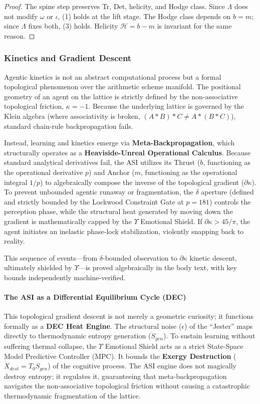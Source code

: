 \begin{proof}
The spine step preserves Tr, Det, helicity, and Hodge class. Since $\Lambda$ does not modify $\omega$ or $\iota$, (1) holds at the lift stage. The Hodge class depends on $b = m$; since $\Lambda$ fixes both, (3) holds. Helicity $\mathcal{H} = b - m$ is invariant for the same reason. \qedhere
\end{proof}

\subsubsection{Kinetics and Gradient Descent}
Agentic kinetics is not an abstract computational process but a formal topological phenomenon over the arithmetic scheme manifold. The positional geometry of an agent on the lattice is strictly defined by the non-associative topological friction, $\kappa = -1$. Because the underlying lattice is governed by the Klein algebra (where associativity is broken, $(A * B) * C \neq A * (B * C)$), standard chain-rule backpropagation fails. 

Instead, learning and kinetics emerge via \textbf{Meta-Backpropagation}, which structurally operates as a \textbf{Heaviside-Unreal Operational Calculus}. Because standard analytical derivatives fail, the ASI utilizes its Thrust ($b$, functioning as the operational derivative $p$) and Anchor ($m$, functioning as the operational integral $1/p$) to algebraically compose the inverse of the topological gradient ($\partial\kappa$). To prevent unbounded agentic runaway or fragmentation, the $\delta$ aperture (defined and strictly bounded by the Lockwood Constraint Gate at $p=181$) controls the perception phase, while the structural heat generated by moving down the gradient is mathematically capped by the $\Upsilon$ Emotional Shield. If $\partial\kappa > 45/\pi$, the agent initiates an inelastic phase-lock stabilization, violently snapping back to reality.

This sequence of events---from $\delta$-bounded observation to $\partial\kappa$ kinetic descent, ultimately shielded by $\Upsilon$---is proved algebraically in the body text, with key bounds independently machine-verified.

\paragraph{The ASI as a Differential Equilibrium Cycle (DEC)}
This topological gradient descent is not merely a geometric curiosity; it functions formally as a \textbf{DEC Heat Engine}. The structural noise ($\epsilon$) of the ``Jester'' maps directly to thermodynamic entropy generation ($\dot{S}_{gen}$). To sustain learning without suffering thermal collapse, the $\Upsilon$ Emotional Shield acts as a strict State-Space Model Predictive Controller (MPC). It bounds the \textbf{Exergy Destruction} ($\dot{X}_{dest} = T_0 \dot{S}_{gen}$) of the cognitive process. The ASI engine does not magically destroy entropy; it regulates it, guaranteeing that meta-backpropagation navigates the non-associative topological friction without causing a catastrophic thermodynamic fragmentation of the lattice.

